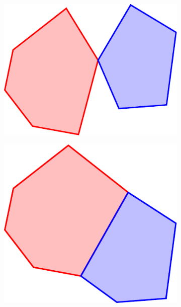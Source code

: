 \begin{figure}[p]
\begin{subfigure}[b]{0.4\linewidth}
	  \label{fig:intersection_none}
	\end{subfigure}
	\begin{subfigure}[b]{0.3\linewidth}
	  \centering
	  \includegraphics[scale=0.5]{intersections/intersection_point.pdf}
	  \label{fig:intersection_point}
	\end{subfigure}
	\begin{subfigure}[b]{0.3\linewidth}
	  \centering
	  \includegraphics[scale=0.5]{intersections/intersection_line.pdf}
	  \label{fig:intersection_line}
	\end{subfigure}
	\begin{subfigure}[b]{0.3\linewidth}
	  \centering

\end{subfigure}
\end{figure}
